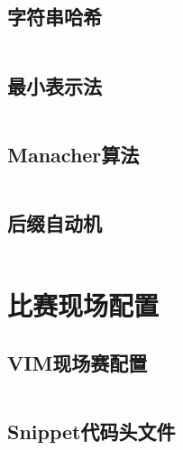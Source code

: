\documentclass[a4paper,12pt]{article}
\begin{document}
\subsection{字符串哈希}
\inputminted[breaklines]{c++}{string/hash.cc}
\subsection{最小表示法}
\inputminted[breaklines]{c++}{string/minimal.cc}
\subsection{Manacher算法}
\inputminted[breaklines]{c++}{string/manacher.cc}
\subsection{后缀自动机}
\inputminted[breaklines]{c++}{string/suffix-automaton.cc}


\newpage
\section{比赛现场配置}
\subsection{VIM现场赛配置}
\inputminted[breaklines]{bash}{others/vim.bash}
\subsection{Snippet代码头文件}
\inputminted[breaklines]{c++}{others/head.cc}
\end{document}
